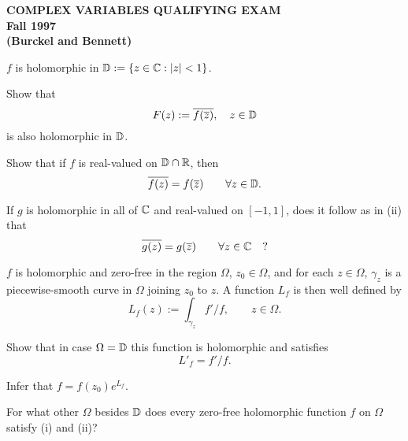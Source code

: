 \documentclass[bbb]{report}
\begin{document}
\pagestyle{empty}

\begin{Large}
\begin{center}
{\bf   COMPLEX VARIABLES QUALIFYING EXAM \\
   Fall 1997 \\
   (Burckel and Bennett)} \\
\end{center}
\end{Large}

\begin{large}

\vspace{.2in}

\begin{description}
{\bf

\item[1.]  
$f$ is holomorphic in ${\Bbb D}:=\{z\in{\Bbb C}:|z|<1\}$.

\item[\quad (i)] Show that 
$$F(z):=\overline{f(\overline{z})},\quad z\in{\Bbb D}$$
is also holomorphic in ${\Bbb D}$.

\item[\quad(ii)] Show that if $f$ is real-valued on 
${\Bbb D}\cap{\Bbb R}$, then
$$\overline{f(z)}=f(\overline{z})\qquad \forall z\in{\Bbb D}. $$

\item[\quad (iii)] If $g$ is holomorphic in all of ${\Bbb C}$ 
and real-valued on $[-1,1]$, does it follow as in (ii) that
$$ \overline{g(z)}=g(\overline{z})\qquad \forall z\in {\Bbb C}\quad? $$

\vspace{.5in}

\item[2.] $f$ is holomorphic and zero-free in the region $\Omega$, 
$z_0\in\Omega$, and for each $z\in\Omega$, $\gamma_z$ is a 
piecewise-smooth curve in $\Omega$ joining $z_0$ to $z$. A function 
$L_f$ is then well defined by
$$ L_f(z):=\int_{\gamma_z} f'/f, \qquad z\in\Omega. $$

\item[\quad (i)] Show that in case $\Omega={\Bbb D}$ this function 
is holomorphic and satisfies
$$ L'_f=f'/f. $$

\item[\quad (ii)] Infer that $f=f(z_0)e^{L_f}$.

\item[\quad (iii)] For what other $\Omega$ besides ${\Bbb D}$ does 
every zero-free holomorphic function $f$ on $\Omega$ satisfy (i) and (ii)?

}
\end{description}
\end{large}
\end{document}
